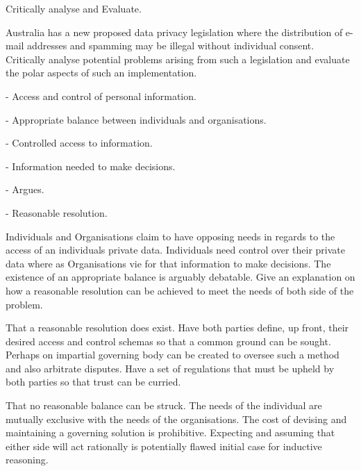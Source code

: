 
Critically analyse and Evaluate.


Australia has a new proposed data privacy legislation where the distribution of e-mail addresses and spamming may be illegal without individual consent. Critically analyse potential problems arising from such a legislation and evaluate the polar aspects of such an implementation.



\item - Access and control of personal information.
\item - Appropriate balance between individuals and organisations.
\item - Controlled access to information.
\item - Information needed to make decisions.


\item - Argues.
\item - Reasonable resolution.


Individuals and Organisations claim to have opposing needs in regards to the access of an individuals private data. Individuals need control over their private data where as Organisations vie for that information to make decisions. The existence of an appropriate balance is arguably debatable. Give an explanation on how a reasonable resolution can be achieved to meet the needs of both side of the problem.


That a reasonable resolution does exist. Have both parties define, up front, their desired access and control schemas so that a common ground can be sought. Perhaps on impartial governing body can be created to oversee such a method and also arbitrate disputes. Have a set of regulations that must be upheld by both parties so that trust can be curried.


That no reasonable balance can be struck. The needs of the individual are mutually exclusive with the needs of the organisations. The cost of devising and maintaining a governing solution is prohibitive. Expecting and assuming that either side will act rationally is potentially flawed initial case for inductive reasoning.

